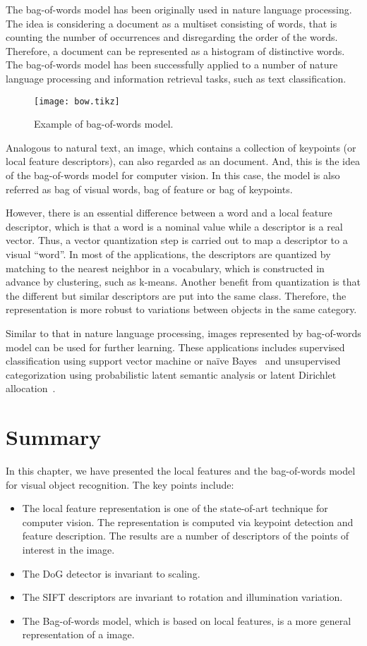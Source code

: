 \documentclass[12pt,final,twoside]{report}
\begin{document}
The bag-of-words model has been originally used in nature language processing. The idea is considering a document as a multiset consisting of words, that is counting the number of occurrences and disregarding the order of the words. Therefore, a document can be represented as a histogram of distinctive words. The bag-of-words model has been successfully applied to a number of nature language processing and information retrieval tasks, such as text classification.

\begin{figure}[t]
  \centering
  \texttt{[image: bow.tikz]}
  \caption{Example of bag-of-words model.}
  \label{fig:bow}
\end{figure}


Analogous to natural text, an image, which contains a collection of keypoints (or local feature descriptors), can also regarded as an document. And, this is the idea of the bag-of-words model for computer vision. In this case, the model is also referred as bag of visual words, bag of feature or bag of keypoints. 

However, there is an essential difference between a word and a local feature descriptor, which is that a word is a nominal value while a descriptor is a real vector. Thus, a vector quantization step is carried out to map a descriptor to a visual ``word''. In most of the applications, the descriptors are quantized by matching to the nearest neighbor in a vocabulary, which is constructed in advance by clustering, such as k-means. Another benefit from quantization is that the different but similar descriptors are put into the same class. Therefore, the representation is more robust to variations between objects in the same category.

Similar to that in nature language processing, images represented by bag-of-words model can be used for further learning. These applications includes supervised classification using support vector machine or na\"ive Bayes~\cite{csurka_visual_2004} and unsupervised categorization using probabilistic latent semantic analysis or latent Dirichlet allocation~\cite{sivic_discovering_2005}.

\section{Summary}
In this chapter, we have presented the local features and the bag-of-words model for visual object recognition. The key points include:
\begin{itemize}
  \item The local feature representation is one of the state-of-art technique for computer vision. The representation is computed via keypoint detection and feature description. The results are a number of descriptors of the points of interest in the image. 
  \item The DoG detector is invariant to scaling.
  \item The SIFT descriptors are invariant to rotation and illumination variation.
  \item The Bag-of-words model, which is based on local features, is a more general representation of a image. 
\end{itemize}
\end{document}
